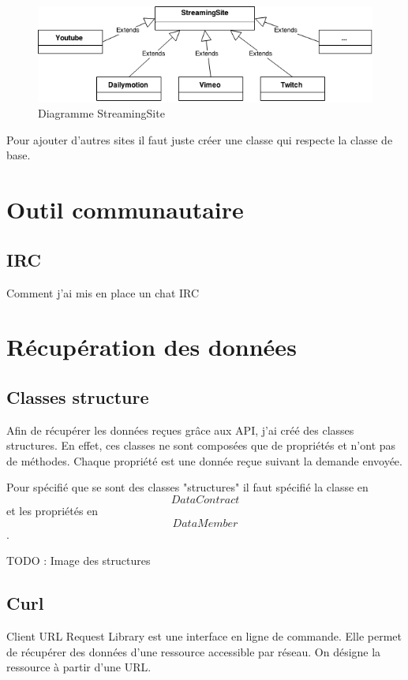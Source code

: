 \documentclass[11pt]{report} %
\begin{document}
			\begin{figure}[h]
				\center
				\includegraphics[width=1\textwidth]{../img/StreamingSite.png}
				\caption{Diagramme StreamingSite}
				\label{streaming site}
			\end{figure}
			
			Pour ajouter d'autres sites il faut juste créer une classe qui respecte la classe de base.
	
	\section{Outil communautaire}
		\subsection{IRC}
		Comment j'ai mis en place un chat IRC
		
	
	\section{Récupération des données}
		\subsection{Classes structure}
		Afin de récupérer les données reçues grâce aux API, j'ai créé des classes structures. En effet, ces classes ne sont composées que de propriétés et n'ont pas de méthodes. Chaque propriété est une donnée reçue suivant la demande envoyée.
		
		Pour spécifié que se sont des classes "structures" il faut spécifié la classe en \textit{\[DataContract\]} et les propriétés en \textit{\[DataMember\]}.
		
		TODO : Image des structures
		
		\subsection{Curl}
		Client URL Request Library est une interface en ligne de commande. Elle permet de récupérer des données d'une ressource accessible par réseau. On désigne la ressource à partir d'une URL.
		
\end{document}
